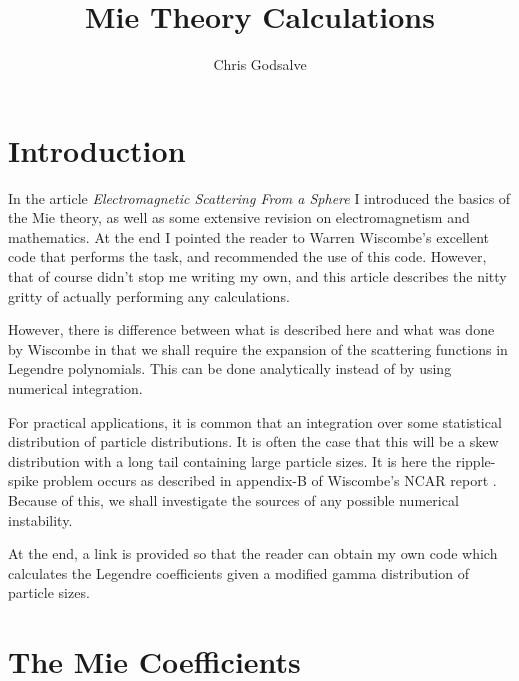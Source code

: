 \setlength{\textheight}{9.80in}
\setlength{\textwidth}{6.40in}
\setlength{\oddsidemargin}{0.0mm}
\setlength{\evensidemargin}{1.0mm}
\setlength{\topmargin}{-0.6in}
\setlength{\parindent}{0.2in}
\setlength{\parskip}{1.5ex}
\newtheorem{defn}{Definition}
\renewcommand{\baselinestretch}{1.2}






\thispagestyle{empty}

\title{Mie Theory Calculations}
\author{Chris Godsalve}
\maketitle

\tableofcontents


\section{Introduction}

In the article {\it Electromagnetic Scattering From a Sphere} \cite{EMScatt:Mybib} I 
introduced the basics of the Mie theory, as well as some extensive revision on 
electromagnetism and mathematics. At the end I pointed the reader to Warren Wiscombe's 
excellent code that performs the task, and recommended the use of this code. 
However, that of course didn't stop me writing my own, and this article 
describes the nitty gritty of actually performing any calculations. 

However, there is difference between what is described here and what was 
done by Wiscombe in that we shall require the expansion of the scattering 
functions in Legendre polynomials. 
This can be done analytically  instead of by using numerical integration. 

For practical applications, it is common that an integration over some statistical distribution of particle distributions.
It is often the case that this will be a skew distribution with a long tail containing large particle sizes. It is here
the ripple-spike problem occurs as described in appendix-B of Wiscombe's NCAR report \cite{WisRep:Mybib}.
 Because of this, we shall investigate the sources of any possible numerical instability.

At the end, a link is provided so that the reader can obtain my own code which calculates the Legendre coefficients
given a modified gamma distribution of particle sizes.

\section{The Mie Coefficients}

